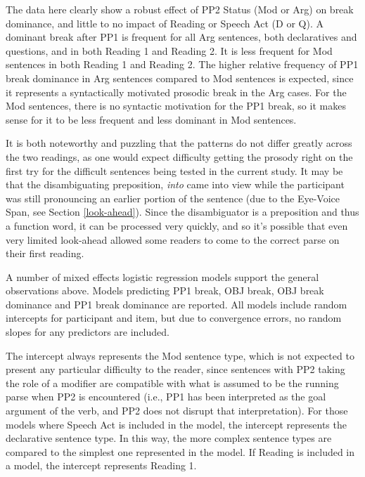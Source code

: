 \documentclass[11pt,oneside]{book}
\begin{document}
The data here clearly show a robust effect of PP2 Status (Mod or Arg) on break dominance, and little to no impact of Reading or Speech Act (D or Q). A dominant break after PP1 is frequent for all Arg sentences, both declaratives and questions, and in both Reading 1 and Reading 2. It is less frequent for Mod sentences in both Reading 1 and Reading 2. The higher relative frequency of PP1 break dominance in Arg sentences compared to Mod sentences is expected, since it represents a syntactically motivated prosodic break in the Arg cases. For the Mod sentences, there is no syntactic motivation for the PP1 break, so it makes sense for it to be less frequent and less dominant in Mod sentences.

It is both noteworthy and puzzling that the patterns do not differ greatly across the two readings, as one would expect difficulty getting the prosody right on the first try for the difficult sentences being tested in the current study. It may be that the disambiguating preposition, \emph{into} came into view while the participant was still pronouncing an earlier portion of the sentence (due to the Eye-Voice Span, see Section \ref{look-ahead}). Since the disambiguator is a preposition and thus a function word, it can be processed very quickly, and so it's possible that even very limited look-ahead allowed some readers to come to the correct parse on their first reading.

A number of mixed effects logistic regression models support the general observations above. Models predicting PP1 break, OBJ break, OBJ break dominance and PP1 break dominance are reported. All models include random intercepts for participant and item, but due to convergence errors, no random slopes for any predictors are included.

The intercept always represents the Mod sentence type, which is not expected to present any particular difficulty to the reader, since sentences with PP2 taking the role of a modifier are compatible with what is assumed to be the running parse when PP2 is encountered (i.e., PP1 has been interpreted as the goal argument of the verb, and PP2 does not disrupt that interpretation). For those models where Speech Act is included in the model, the intercept represents the declarative sentence type. In this way, the more complex sentence types are compared to the simplest one represented in the model. If Reading is included in a model, the intercept represents Reading 1.
\end{document}

